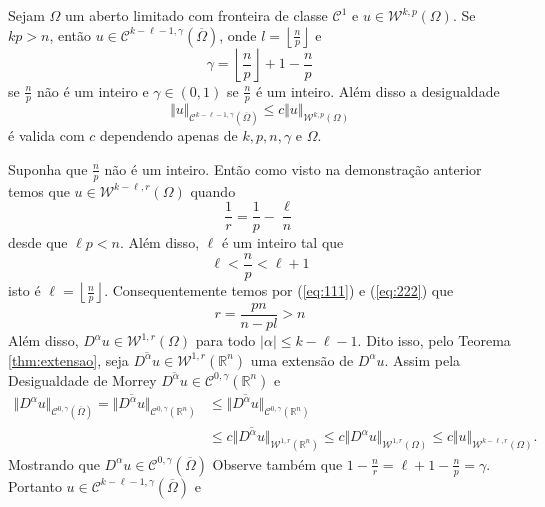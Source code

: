 \documentclass[a4paper, 11pt]{book}
\theoremstyle{definition}
\newcommand{\bR}{\mathbb{R}}
\newcommand{\cC}{\mathcal{C}}
\newcommand{\cW}{\mathcal{W}}
\begin{document}
\begin{tbox}
    Sejam $\Omega$ um aberto limitado com fronteira de classe $\cC^1$ e $u \in \cW^{k,p}(\Omega)$. 
    Se $kp > n$, então $u \in \cC^{k - \ell - 1,\gamma}(\overline\Omega)$, onde $l = \left\lfloor \frac{n}{p} \right\rfloor$ e
    \[
        \gamma = \left\lfloor \frac{n}{p} \right\rfloor + 1 - \frac{n}{p}
    \]
    se $\frac{n}{p}$ não é um inteiro e $\gamma \in (0,1)$ se $\frac{n}{p}$ é um inteiro.
    Além disso a desigualdade
    \[
        \Vert u \Vert_{\cC^{k - \ell - 1,\gamma}(\overline\Omega)} \leqslant c \Vert u \Vert_{\cW^{k,p}(\Omega)}
    \]
    é valida com $c$ dependendo apenas de $k, p, n, \gamma$ e $\Omega$.
\end{tbox}
\begin{prf}
    Suponha que $\frac{n}{p}$ não é um inteiro. Então como visto na demonstração anterior temos que $u \in \cW^{k-\ell,r}(\Omega)$ quando
    \begin{equation} \label{eq:111}
        \frac{1}{r} = \frac{1}{p} - \frac{\ell}{n}
    \end{equation}
    desde que $\ell p < n$. Além disso, $\ell$ é um inteiro tal que
    \begin{equation} \label{eq:222}
        \ell < \frac{n}{p} < \ell + 1
    \end{equation}
    isto é $\ell = \left\lfloor \frac{n}{p} \right\rfloor$.
    Consequentemente temos por (\ref{eq:111}) e (\ref{eq:222}) que
    \[
        r = \frac{pn}{n-pl} > n
    \]
    Além disso, $D^\alpha u \in \cW^{1,r}(\Omega)$ para todo $|\alpha| \leqslant k - \ell -1$. Dito isso, pelo Teorema \ref{thm:extensao}, seja $\overline{D^\alpha u} \in \cW^{1,r}(\bR^n)$ uma extensão de $D^\alpha u$.
    Assim pela Desigualdade de Morrey $\overline{D^\alpha u} \in \cC^{0,\gamma}(\bR^n)$ e
    \[
        \begin{aligned}
            \Vert D^\alpha u \Vert_{\cC^{0,\gamma}(\overline\Omega)} = \Vert \overline{D^\alpha u} \Vert_{\cC^{0,\gamma}(\bR^n)} &\leqslant \Vert \overline{D^\alpha u} \Vert_{\cC^{0,\gamma}(\bR^n)} \\
            &\leqslant c \Vert \overline{D^\alpha u} \Vert_{\cW^{1,r}(\bR^n)}\leqslant c \Vert D^\alpha u \Vert_{\cW^{1,r}(\Omega)} \leqslant c \Vert u \Vert_{\cW^{k-\ell,r}(\Omega)}.
        \end{aligned}
    \]
    Mostrando que $D^\alpha u \in \cC^{0,\gamma}(\overline\Omega)$
    Observe também que $1 - \frac{n}{r} = \ell +1 - \frac{n}{p} = \gamma$.
    Portanto $u \in \cC^{k-\ell-1,\gamma}(\overline\Omega)$ e

\end{prf}
\end{document}
